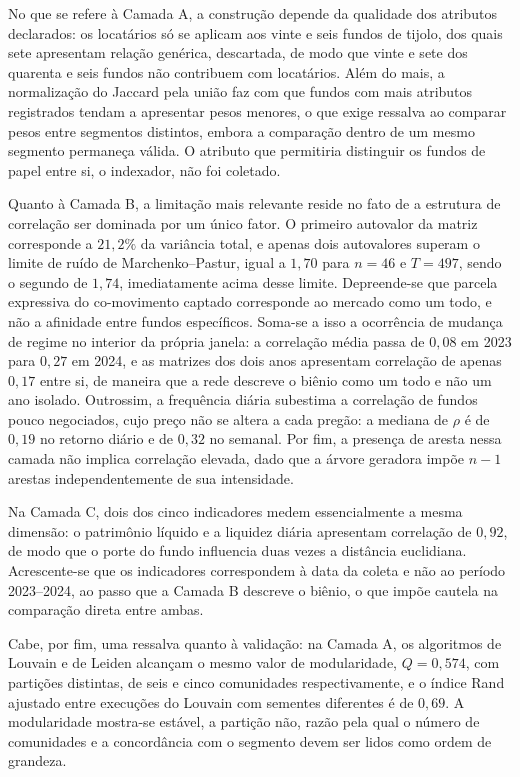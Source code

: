 No que se refere à Camada A, a construção depende da qualidade dos atributos
declarados: os locatários só se aplicam aos vinte e seis fundos de tijolo, dos
quais sete apresentam relação genérica, descartada, de modo que vinte e sete
dos quarenta e seis fundos não contribuem com locatários. Além do mais, a
normalização do Jaccard pela união faz com que fundos com mais atributos
registrados tendam a apresentar pesos menores, o que exige ressalva ao
comparar pesos entre segmentos distintos, embora a comparação dentro de um
mesmo segmento permaneça válida. O atributo que permitiria distinguir os
fundos de papel entre si, o indexador, não foi coletado.

Quanto à Camada B, a limitação mais relevante reside no fato de a estrutura de
correlação ser dominada por um único fator. O primeiro autovalor da matriz
corresponde a $21{,}2\%$ da variância total, e apenas dois autovalores superam
o limite de ruído de Marchenko--Pastur, igual a $1{,}70$ para $n = 46$ e
$T = 497$, sendo o segundo de $1{,}74$, imediatamente acima desse limite.
Depreende-se que parcela expressiva do co-movimento captado corresponde ao
mercado como um todo, e não a afinidade entre fundos específicos. Soma-se a
isso a ocorrência de mudança de regime no interior da própria janela: a
correlação média passa de $0{,}08$ em 2023 para $0{,}27$ em 2024, e as
matrizes dos dois anos apresentam correlação de apenas $0{,}17$ entre si, de
maneira que a rede descreve o biênio como um todo e não um ano isolado.
Outrossim, a frequência diária subestima a correlação de fundos pouco
negociados, cujo preço não se altera a cada pregão: a mediana de $\rho$ é de
$0{,}19$ no retorno diário e de $0{,}32$ no semanal. Por fim, a presença de
aresta nessa camada não implica correlação elevada, dado que a árvore geradora
impõe $n-1$ arestas independentemente de sua intensidade.

Na Camada C, dois dos cinco indicadores medem essencialmente a mesma dimensão:
o patrimônio líquido e a liquidez diária apresentam correlação de $0{,}92$, de
modo que o porte do fundo influencia duas vezes a distância euclidiana.
Acrescente-se que os indicadores correspondem à data da coleta e não ao
período 2023--2024, ao passo que a Camada B descreve o biênio, o que impõe
cautela na comparação direta entre ambas.

Cabe, por fim, uma ressalva quanto à validação: na Camada A, os algoritmos de
Louvain e de Leiden alcançam o mesmo valor de modularidade, $Q = 0{,}574$, com
partições distintas, de seis e cinco comunidades respectivamente, e o índice
Rand ajustado entre execuções do Louvain com sementes diferentes é de
$0{,}69$. A modularidade mostra-se estável, a partição não, razão pela qual o
número de comunidades e a concordância com o segmento devem ser lidos como
ordem de grandeza.
